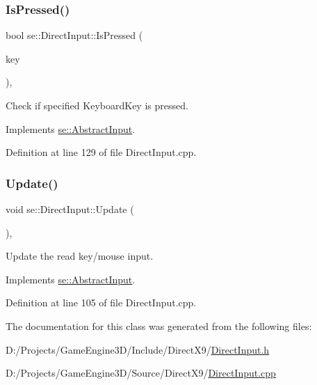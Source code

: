\mbox{\label{classse_1_1_direct_input_ad9669e6834c3fcac489050a82beb71f7}} 
\subsubsection{\texorpdfstring{Is\+Pressed()}{IsPressed()}}
{\footnotesize\ttfamily bool se\+::\+Direct\+Input\+::\+Is\+Pressed (\begin{DoxyParamCaption}\item[{\mbox{\hyperlink{namespacese_a94221cf8f238f1eadbe3ac4b8ac7bc71}{Keyboard\+Key}}}]{key }\end{DoxyParamCaption})\hspace{0.3cm}{\ttfamily [override]}, {\ttfamily [virtual]}}

Check if specified Keyboard\+Key is pressed. 

Implements \mbox{\hyperlink{classse_1_1_abstract_input_a4375b92281cee63064c898a791ddd1a3}{se\+::\+Abstract\+Input}}.



Definition at line 129 of file Direct\+Input.\+cpp.

\mbox{\label{classse_1_1_direct_input_a863123d7304364a55fd2135f27195500}} 
\subsubsection{\texorpdfstring{Update()}{Update()}}
{\footnotesize\ttfamily void se\+::\+Direct\+Input\+::\+Update (\begin{DoxyParamCaption}{ }\end{DoxyParamCaption})\hspace{0.3cm}{\ttfamily [override]}, {\ttfamily [virtual]}}

Update the read key/mouse input. 

Implements \mbox{\hyperlink{classse_1_1_abstract_input_a7c9b63e9df453d38c035fb9fa91c0d70}{se\+::\+Abstract\+Input}}.



Definition at line 105 of file Direct\+Input.\+cpp.



The documentation for this class was generated from the following files\+:\begin{DoxyCompactItemize}
\item 
D\+:/\+Projects/\+Game\+Engine3\+D/\+Include/\+Direct\+X9/\mbox{\hyperlink{_direct_input_8h}{Direct\+Input.\+h}}\item 
D\+:/\+Projects/\+Game\+Engine3\+D/\+Source/\+Direct\+X9/\mbox{\hyperlink{_direct_input_8cpp}{Direct\+Input.\+cpp}}\end{DoxyCompactItemize}
